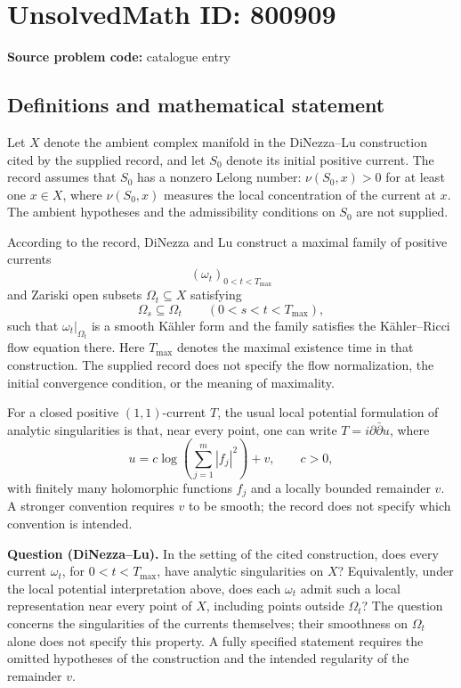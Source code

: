 \documentclass[11pt]{article}
\begin{document}
\section*{UnsolvedMath ID: 800909}
\textbf{Source problem code:} catalogue entry
\subsection{Definitions and mathematical statement}
Let \(X\) denote the ambient complex manifold in the DiNezza--Lu construction cited by the supplied record, and let \(S_0\) denote its initial positive current. The record assumes that \(S_0\) has a nonzero Lelong number: \(\nu(S_0,x)>0\) for at least one \(x\in X\), where \(\nu(S_0,x)\) measures the local concentration of the current at \(x\). The ambient hypotheses and the admissibility conditions on \(S_0\) are not supplied.

According to the record, DiNezza and Lu construct a maximal family of positive currents
\[
(\omega_t)_{0<t<T_{\max}}
\]
and Zariski open subsets \(\Omega_t\subseteq X\) satisfying
\[
\Omega_s\subseteq\Omega_t\qquad(0<s<t<T_{\max}),
\]
such that \(\omega_t|_{\Omega_t}\) is a smooth K\"ahler form and the family satisfies the K\"ahler--Ricci flow equation there. Here \(T_{\max}\) denotes the maximal existence time in that construction. The supplied record does not specify the flow normalization, the initial convergence condition, or the meaning of maximality.

For a closed positive \((1,1)\)-current \(T\), the usual local potential formulation of analytic singularities is that, near every point, one can write \(T=i\partial\bar\partial u\), where
\[
u=c\log\!\left(\sum_{j=1}^{m}|f_j|^2\right)+v,
\qquad c>0,
\]
with finitely many holomorphic functions \(f_j\) and a locally bounded remainder \(v\). A stronger convention requires \(v\) to be smooth; the record does not specify which convention is intended.

\textbf{Question (DiNezza--Lu).} In the setting of the cited construction, does every current \(\omega_t\), for \(0<t<T_{\max}\), have analytic singularities on \(X\)? Equivalently, under the local potential interpretation above, does each \(\omega_t\) admit such a local representation near every point of \(X\), including points outside \(\Omega_t\)? The question concerns the singularities of the currents themselves; their smoothness on \(\Omega_t\) alone does not specify this property. A fully specified statement requires the omitted hypotheses of the construction and the intended regularity of the remainder \(v\).
\end{document}
